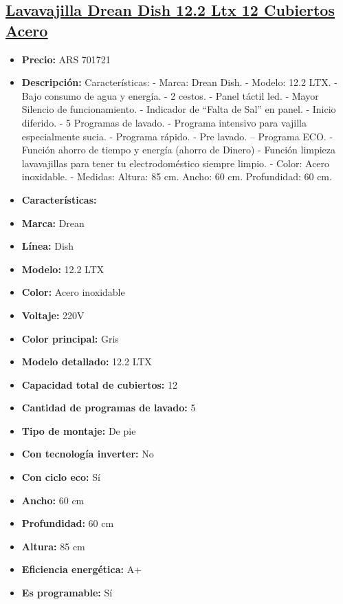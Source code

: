 \documentclass{article}
\begin{document}
\begin{adjustwidth}{2em}{}
\subsection{\uline{\href{https://www.mercadolibre.com.ar/lavavajilla-drean-dish-122-ltx-12-cubiertos-acero/p/MLA23619580}{Lavavajilla Drean Dish 12.2 Ltx 12 Cubiertos Acero}}}
\begin{itemize}
    \item \textbf{Precio:} ARS 701721
    \item \textbf{Descripción:} Características:
- Marca: Drean Dish.
- Modelo: 12.2 LTX.
- Bajo consumo de agua y energía.
- 2 cestos.
- Panel táctil led.
- Mayor Silencio de funcionamiento.
- Indicador de “Falta de Sal” en panel.
- Inicio diferido.
- 5 Programas de lavado.
- Programa intensivo para vajilla especialmente sucia.
- Programa rápido.
- Pre lavado.
– Programa ECO.
- Función ahorro de tiempo y energía (ahorro de Dinero)
- Función limpieza lavavajillas para tener tu electrodoméstico siempre limpio.
- Color: Acero inoxidable.
- Medidas: Altura: 85 cm. Ancho: 60 cm. Profundidad: 60 cm.
    \item \textbf{Características:}
    \item \textbf {Marca:} Drean
    \item \textbf {Línea:} Dish
    \item \textbf {Modelo:} 12.2 LTX
    \item \textbf {Color:} Acero inoxidable
    \item \textbf {Voltaje:} 220V
    \item \textbf {Color principal:} Gris
    \item \textbf {Modelo detallado:} 12.2 LTX
    \item \textbf {Capacidad total de cubiertos:} 12
    \item \textbf {Cantidad de programas de lavado:} 5
    \item \textbf {Tipo de montaje:} De pie
    \item \textbf {Con tecnología inverter:} No
    \item \textbf {Con ciclo eco:} Sí
    \item \textbf {Ancho:} 60 cm
    \item \textbf {Profundidad:} 60 cm
    \item \textbf {Altura:} 85 cm
    \item \textbf {Eficiencia energética:} A+
    \item \textbf {Es programable:} Sí

\end{itemize}
\end{adjustwidth}
\end{document}

